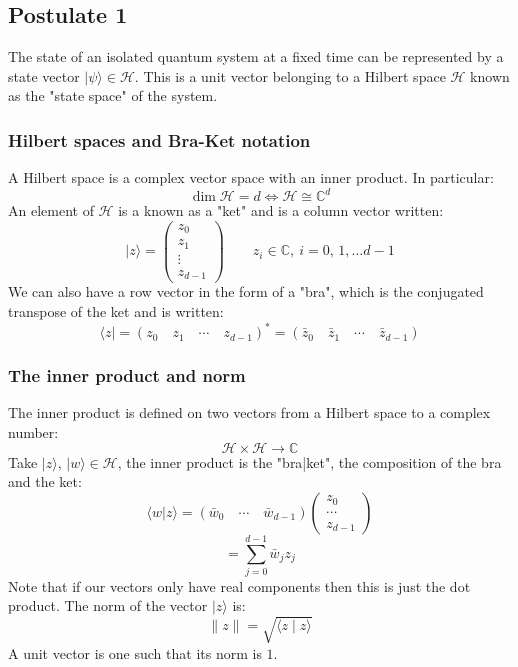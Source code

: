 \documentclass[12pt]{article}
\begin{document}
\subsection*{Postulate 1}
The state of an isolated quantum system at a fixed time can be represented by a state vector \(|\psi\rangle \in \mathcal{H}\). This is a unit vector belonging to a Hilbert space \(\mathcal{H}\) known as the "state space" of the system.
\subsubsection*{Hilbert spaces and Bra-Ket notation}
A Hilbert space is a complex vector space with an inner product. In particular:
\[\dim\mathcal{H}=d\iff \mathcal{H}\cong \mathbb{C}^d\]
An element of \(\mathcal{H}\) is a known as a "ket" and is a column vector written:
\[|z\rangle =\begin{pmatrix}
    z_0\\z_1\\\vdots\\z_{d-1}
\end{pmatrix}\qquad z_i\in \mathbb{C},\ i=0,\,1,\dots d-1\]
We can also have a row vector in the form of a "bra", which is the conjugated transpose of the ket and is written:
\[\langle z|={(z_0\quad z_1\quad \cdots \quad z_{d-1})^*}=(\bar{z}_0\quad \bar{z}_1\quad \cdots \quad \bar{z}_{d-1})\]
\subsubsection*{The inner product and norm}
The inner product is defined on two vectors from a Hilbert space to a complex number:
\[\mathcal{H}\times \mathcal{H}\to \mathbb{C}\]
Take \(|z\rangle,\, |w\rangle \in\mathcal{H}\), the inner product is the "bra|ket", the composition of the bra and the ket:
\[\langle w|z\rangle = (\bar{w}_0\quad \cdots \quad \bar{w}_{d-1})\begin{pmatrix}
    z_0\\
    \cdots \\
    z_{d-1}
\end{pmatrix}\]
\[=\sum^{d-1}_{j=0}\bar{w}_jz_j\]
Note that if our vectors only have real components then this is just the dot product. The norm of the vector \(|z\rangle\) is:
\[\|z\|=\sqrt{\langle z\mid z\rangle }\]
A unit vector is one such that its norm is \(1\).
\end{document}
